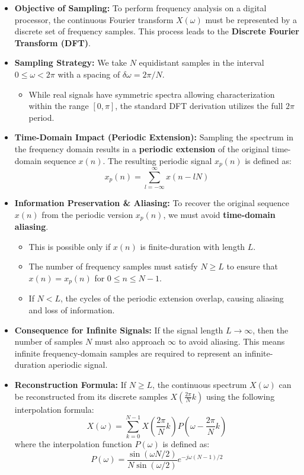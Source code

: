 \begin{itemize}
\tightlist
\item
  \textbf{Objective of Sampling:} To perform frequency analysis on a
  digital processor, the continuous Fourier transform \(X(\omega)\) must
  be represented by a discrete set of frequency samples. This process
  leads to the \textbf{Discrete Fourier Transform (DFT)}.
\item
  \textbf{Sampling Strategy:} We take \(N\) equidistant samples in the
  interval \(0 \leq \omega < 2\pi\) with a spacing of
  \(\delta \omega = 2\pi/N\).

  \begin{itemize}
  \tightlist
  \item
    While real signals have symmetric spectra allowing characterization
    within the range \([0, \pi]\), the standard DFT derivation utilizes
    the full \(2\pi\) period.
  \end{itemize}
\item
  \textbf{Time-Domain Impact (Periodic Extension):} Sampling the
  spectrum in the frequency domain results in a \textbf{periodic
  extension} of the original time-domain sequence \(x(n)\). The
  resulting periodic signal \(x_p(n)\) is defined as:
  \[x_p(n) = \sum_{l=-\infty}^{\infty} x(n-lN)\]
\item
  \textbf{Information Preservation \& Aliasing:} To recover the original
  sequence \(x(n)\) from the periodic version \(x_p(n)\), we must avoid
  \textbf{time-domain aliasing}.

  \begin{itemize}
  \tightlist
  \item
    This is possible only if \(x(n)\) is finite-duration with length
    \(L\).
  \item
    The number of frequency samples must satisfy \textbf{\(N \ge L\)} to
    ensure that \(x(n) = x_p(n)\) for \(0 \leq n \leq N-1\).
  \item
    If \(N < L\), the cycles of the periodic extension overlap, causing
    aliasing and loss of information.
  \end{itemize}
\item
  \textbf{Consequence for Infinite Signals:} If the signal length
  \(L \rightarrow \infty\), then the number of samples \(N\) must also
  approach \(\infty\) to avoid aliasing. This means infinite
  frequency-domain samples are required to represent an
  infinite-duration aperiodic signal.
\item
  \textbf{Reconstruction Formula:} If \(N \ge L\), the continuous
  spectrum \(X(\omega)\) can be reconstructed from its discrete samples
  \(X(\frac{2\pi}{N}k)\) using the following interpolation formula:
  \[X(\omega) = \sum_{k=0}^{N-1} X\left(\frac{2\pi}{N}k\right) P\left(\omega - \frac{2\pi}{N}k\right)\]
  where the interpolation function \(P(\omega)\) is defined as:
  \[P(\omega) = \frac{\sin(\omega N/2)}{N \sin(\omega/2)} e^{-j\omega(N-1)/2}\]
\end{itemize}

